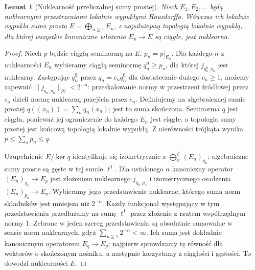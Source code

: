 \documentclass[11pt,a4paper]{article}
\numberwithin{equation}{section}
\theoremstyle{plain}
\newtheorem{lemat}[twierdzenie]{Lemat}
\theoremstyle{definition}
\theoremstyle{remark}
\begin{document}
\begin{lemat}[Nuklearność przeliczalnej sumy prostej]
\label{lem:nuclear-direct-sum23}
Niech $E_1,E_2,\ldots$ będą nuklearnymi przestrzeniami
lokalnie wypukłymi Hausdorffa. Wówczas ich lokalnie wypukła
suma prosta $E=\bigoplus_{n\ge1}E_n$, z najsilniejszą
topologią lokalnie wypukłą, dla której wszystkie kanoniczne
włożenia $E_n\to E$ są ciągłe, jest nuklearna.
\end{lemat}
\begin{proof}
Niech $p$ będzie ciągłą seminormą na $E$,
$p_n=p|_{E_n}$. Dla każdego $n$ z nuklearności $E_n$
wybieramy ciągłą seminormę $q_n^0\ge p_n$, dla której
$j_{q_n^0,p_n}$ jest nuklearny. Zastępując $q_n^0$
przez $q_n=c_nq_n^0$ dla dostatecznie dużego $c_n\ge1$,
możemy zapewnić
$\|j_{q_n,p_n}\|_{\mathcal N}<2^{-n}$:
przeskalowanie normy w przestrzeni źródłowej przez
$c_n$ dzieli normę nuklearną przejścia przez $c_n$.
Definiujemy na algebraicznej sumie prostej
$q((x_n))=\sum_nq_n(x_n)$; jest to suma skończona.
Seminorma $q$ jest ciągła, ponieważ jej ograniczenie
do każdego $E_n$ jest ciągłe, a topologia sumy prostej
jest końcową topologią lokalnie wypukłą. Z nierówności
trójkąta wynika $p\le\sum_n p_n\le q$.

Uzupełnienie $E/\ker q$ identyfikuje się izometrycznie
z $\bigoplus_n^{\ell^1}(E_n)_{q_n}$: algebraiczne sumy
proste są gęste w tej sumie $\ell^1$.
Dla ustalonego $n$ kanoniczny operator
$(E_n)_{q_n}\to E_p$ jest złożeniem nuklearnego
$j_{q_n,p_n}$ i izometrycznego osadzenia
$(E_n)_{p_n}\to E_p$.
Wybieramy jego przedstawienie nuklearne, którego suma
norm składników jest mniejsza niż $2^{-n}$.
Każdy funkcjonał występujący w tym przedstawieniu
przedłużamy na sumę $\ell^1$ przez złożenie
z rzutem współrzędnym normy $1$.
Zebrane w jeden szereg przedstawienia są absolutnie
sumowalne w sensie norm nuklearnych, gdyż
$\sum_{n\ge1}2^{-n}<\infty$. Ich suma jest dokładnie
kanonicznym operatorem $E_q\to E_p$:
najpierw sprawdzamy tę równość dla wektorów o skończonym
nośniku, a następnie korzystamy z ciągłości i gęstości.
To dowodzi nuklearności $E$.
\end{proof}
\end{document}
